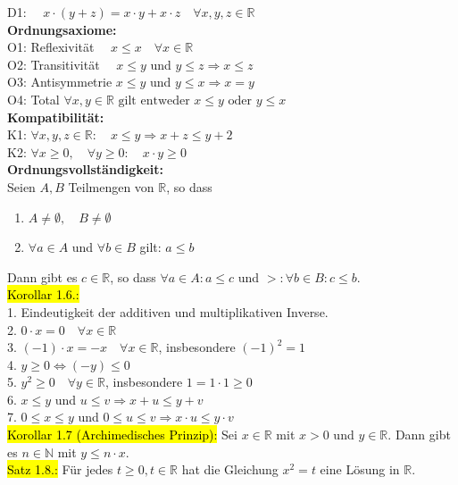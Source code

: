 \documentclass[10pt,landscape]{article}
\newcommand{\green}[1]{\sethlcolor{green}\hl{#1}}
\newcommand{\yellow}[1]{\sethlcolor{yellow} \hl{#1}}
\begin{document}
\begin{multicols}{3}
D1: $\quad x \cdot(y+z)=x \cdot y+x \cdot z \quad \forall x, y, z \in \mathbb{R}$\\
\textbf{Ordnungsaxiome:}\\
O1: Reflexivität $\quad x \leq x \quad \forall x \in \mathbb{R}$\\
O2: Transitivität $\quad x \leq y$ und $y \leq z \Longrightarrow x \leq z$\\
O3: Antisymmetrie $x \leq y$ und $y \leq x \Longrightarrow x=y$\\
O4: Total  $\forall x, y \in \mathbb{R} \text { gilt entweder } x \leq y \text { oder } y \leq x$\\
\textbf{Kompatibilität:}\\
K1: $\forall x, y, z \in \mathbb{R}: \quad x \leq y \Longrightarrow x+z \leq y+2$\\
K2: $\forall x \geq 0, \quad \forall y \geq 0: \quad x \cdot y \geq 0$\\
\textbf{Ordnungsvollständigkeit:}\\
Seien $A, B$ Teilmengen von $\mathbb{R}$, so dass
\begin{enumerate}[label=(\roman*)]
    \item $A \neq \emptyset, \quad B \neq \emptyset$
    \item $\forall a \in A$ und $\forall b \in B$ gilt: $a \leq b$
\end{enumerate}
Dann gibt es $c \in \mathbb{R}$, so dass $\forall a \in A: a \leq c$ und $>: \forall b \in B: c \leq b$.\\
\green{Korollar 1.6.:}\\
1. Eindeutigkeit der additiven und multiplikativen Inverse. \\
2. $0 \cdot x=0 \quad \forall x \in \mathbb{R}$ \\
3. $(-1) \cdot x=-x \quad \forall x \in \mathbb{R}$, insbesondere $(-1)^{2}=1$ \\
4. $y \geq 0 \Longleftrightarrow(-y) \leq 0$ \\
5. $y^{2} \geq 0 \quad \forall y \in \mathbb{R}$, insbesondere $1=1 \cdot 1 \geq 0$ \\
6. $x \leq y$ und $u \leq v \Longrightarrow x+u \leq y+v$ \\
7. $0 \leq x \leq y$ und $0 \leq u \leq v \Longrightarrow x \cdot u \leq y \cdot v$ \\
\green{Korollar 1.7 (Archimedisches Prinzip):} Sei $x \in \mathbb{R}$ mit $x>0$ und $y \in \mathbb{R} .$ Dann gibt es $n \in \mathbb{N}$ mit $y \leq n \cdot x$. \\
\yellow{Satz 1.8.:} Für jedes $t \geq 0, t \in \mathbb{R}$ hat die Gleichung $x^{2}=t$ eine Lösung in $\mathbb{R}$.\\

\end{multicols}
\end{document}
